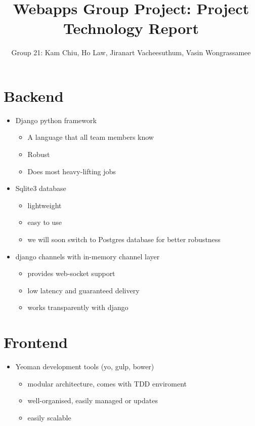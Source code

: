\documentclass[11pt]{article}
\begin{document}
\title{Webapps Group Project: Project Technology Report}
\author{Group 21: Kam Chiu, Ho Law, Jiranart Vacheesuthum, Vasin Wongrassamee}

\maketitle

\section{Backend}
\begin{itemize}
\item Django python framework
\begin{itemize}
\item A language that all team members know
\item Robust
\item Does most heavy-lifting jobs 
\end{itemize}
\item Sqlite3 database
\begin{itemize}
\item lightweight
\item easy to use
\item we will soon switch to Postgres database for better robustness
\end{itemize}
\end{itemize}
\begin{itemize}
\item django channels with in-memory channel layer 
\begin{itemize}
\item provides web-socket support
\item low latency and guaranteed delivery
\item works transparently with django
\end{itemize}
\end{itemize}

\section{Frontend}
\begin{itemize}
\item Yeoman development tools (yo, gulp, bower)
\begin{itemize}
\item modular architecture, comes with TDD enviroment
\item well-organised, easily managed or updates
\item easily scalable 
\end{itemize}
\end{itemize}
\end{document}
